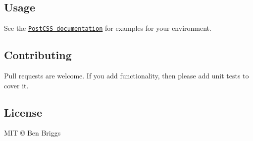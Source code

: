 \subsection*{Usage}

See the \href{https://github.com/postcss/postcss#usage}{\tt Post\+C\+SS documentation} for examples for your environment.

\subsection*{Contributing}

Pull requests are welcome. If you add functionality, then please add unit tests to cover it.

\subsection*{License}

M\+IT © Ben Briggs 